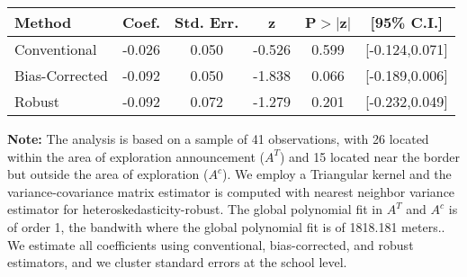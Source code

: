 \begin{table}[htbp]\centering
 \footnotesize 
\begin{tabular}{lccccc}
\hline\hline
Method & Coef. & Std. Err. & z & P$>|$z$|$ & [95\% C.I.] \\ 
\hline \hline  
Conventional & -0.026 & 0.050 & -0.526 & 0.599 & [-0.124,0.071] \\ 
 Bias-Corrected & -0.092 & 0.050 & -1.838 & 0.066 & [-0.189,0.006] \\ 
Robust & -0.092 & 0.072 & -1.279 & 0.201 & [-0.232,0.049] \\ 
  \hline\hline
\end{tabular}
\label{table:rd}
\begin{tablenotes} 
  \justifying \tiny \textbf{Note: }    
   The analysis is based on a sample of 41 observations, with 26 located within the area of exploration announcement ($A^{T}$) and 15 located near the border but outside the area of exploration  ($A^{c}$). 
           We employ a Triangular kernel and the variance-covariance matrix estimator is computed with nearest neighbor variance estimator for heteroskedasticity-robust. The global polynomial fit in  $A^{T}$ and $A^{c}$ is of order 1, the bandwith where the global polynomial fit is of 1818.181 meters.. We estimate all coefficients using conventional, bias-corrected, and robust estimators, and we cluster standard errors at the school level. \end{tablenotes} 
 \end{table} 
